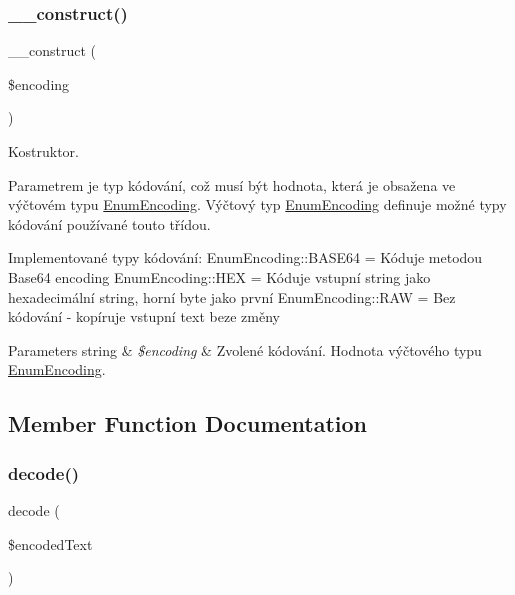\subsubsection{\texorpdfstring{\+\_\+\+\_\+construct()}{\_\_construct()}}
{\footnotesize\ttfamily \+\_\+\+\_\+construct (\begin{DoxyParamCaption}\item[{}]{\$encoding }\end{DoxyParamCaption})}

Kostruktor.

Parametrem je typ kódování, což musí být hodnota, která je obsažena ve výčtovém typu \mbox{\hyperlink{class_pes_1_1_security_1_1_coder_1_1_enum_encoding}{Enum\+Encoding}}. Výčtový typ \mbox{\hyperlink{class_pes_1_1_security_1_1_coder_1_1_enum_encoding}{Enum\+Encoding}} definuje možné typy kódování používané touto třídou.

Implementované typy kódování\+: Enum\+Encoding\+::\+B\+A\+S\+E64 = Kóduje metodou Base64 encoding Enum\+Encoding\+::\+H\+EX = Kóduje vstupní string jako hexadecimální string, horní byte jako první Enum\+Encoding\+::\+R\+AW = Bez kódování -\/ kopíruje vstupní text beze změny


\begin{DoxyParams}[1]{Parameters}
string & {\em \$encoding} & Zvolené kódování. Hodnota výčtového typu \mbox{\hyperlink{class_pes_1_1_security_1_1_coder_1_1_enum_encoding}{Enum\+Encoding}}. \\
\hline
\end{DoxyParams}


\subsection{Member Function Documentation}
\mbox{\label{class_pes_1_1_security_1_1_coder_1_1_coder_aa4be2a14b7ecb0e18e4fde52012f9a47}} 
\subsubsection{\texorpdfstring{decode()}{decode()}}
{\footnotesize\ttfamily decode (\begin{DoxyParamCaption}\item[{}]{\$encoded\+Text }\end{DoxyParamCaption})}

